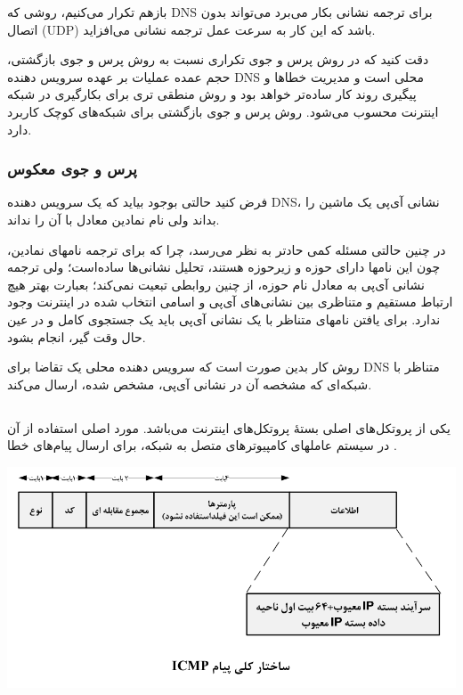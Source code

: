 \documentclass[12pt]{book}
\begin{document}
بازهم تکرار می‌کنیم، روشی که DNS برای ترجمه نشانی بکار می‌برد می‌تواند بدون اتصال (UDP) باشد که این کار به سرعت عمل ترجمه نشانی می‌افزاید.

دقت کنید که در روش پرس و جوی تکراری نسبت به روش پرس و جوی بازگشتی، حجم عمده عملیات بر عهده سرویس دهنده DNS محلی است و مدیریت خطاها و پیگیری روند کار ساده‌تر خواهد بود و روش منطقی تری برای بکارگیری در شبکه اینترنت محسوب می‌شود. روش پرس و جوی بازگشتی برای شبکه‌های کوچک کاربرد دارد.


\subsubsection{پرس و جوی معکوس}

فرض کنید حالتی بوجود بیاید که یک سرویس دهنده DNS، نشانی آی‌پی یک ماشین را بداند ولی نام نمادین معادل با آن را نداند.

در چنین حالتی مسئله کمی حادتر به نظر می‌رسد، چرا که برای ترجمه نامهای نمادین، چون این نامها دارای حوزه و زیرحوزه هستند، تحلیل نشانی‌ها ساده‌است؛ ولی ترجمه نشانی آی‌پی به معادل نام حوزه، از چنین روابطی تبعیت نمی‌کند؛ بعبارت بهتر هیچ ارتباط مستقیم و متناظری بین نشانی‌های آی‌پی و اسامی انتخاب شده در اینترنت وجود ندارد. برای یافتن نامهای متناظر با یک نشانی آی‌پی باید یک جستجوی کامل و در عین حال وقت گیر، انجام بشود.

روش کار بدین صورت است که سرویس دهنده محلی یک تقاضا برای DNS متناظر با شبکه‌ای که مشخصه آن در نشانی آی‌پی، مشخص شده، ارسال می‌کند. 


\subsection{}

یکی از پروتکل‌های اصلی بستهٔ پروتکل‌های اینترنت می‌باشد. مورد اصلی استفاده از آن در سیستم عاملهای کامپیوترهای متصل به شبکه، برای ارسال پیام‌های خطا .


\begin{center}
	\includegraphics[scale=0.5]{./icmp_1.png}
\end{center}
\end{document}
